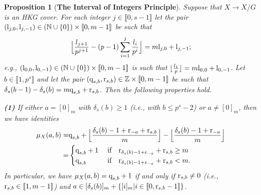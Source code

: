 \documentclass[11pt]{amsart}
\newtheorem{proposition}[theorem]{Proposition}
\def\l{\textup{l}}
\def\r{\textup{r}}
\def\q{\textup{q}}
\begin{document}
\begin{proposition}[{\bf The Interval of Integers Principle}]
\label{P8}
Suppose that $X\rightarrow X/G$ is an HKG cover. For each integer $j\in\llbracket0,s-1\rrbracket$ let the pair $(\l_{j,0},\l_{j,-1})\in (\mathbb N\cup\{0\})\times\llbracket0,m-1\rrbracket$ be such that 
$$\Big\lfloor\frac{l_{j+1}}{p^{j+1}}-(p-1)\sum_{i=1}^j\frac{l_i}{p^i}\Big\rfloor=m\l_{j,0}+\l_{j,-1};$$
e.g., $(\l_{0,0},\l_{0,-1})\in (\mathbb N\cup\{0\})\times\llbracket0,m-1\rrbracket$ is such that $\lfloor\frac{l_1}{p}\rfloor=m\l_{0,0}+\l_{0,-1}$. Let $b\in\llbracket1,p^s\rrbracket$ and let the pair $(\q_{s,b},\r_{s,b})\in \mathbb Z\times\llbracket0,m-1\rrbracket$ be such that $\delta_s(b-1)-\delta_s(b)=m\q_{s,b}+\r_{s,b}$.  Then the following properties hold.

\medskip
{\bf (1)} If either $a=[0]_m$ with $\delta_s(b)\ge 1$ (i.e., with $b\le p^s-2$) or $a\neq [0]_m$, then we have identities
\begin{equation}\label{EQ58}
\begin{split}\mu_X(a,b)=&\q_{s,b}+\Big\lfloor\frac{\delta_s(b)-1+\r_{-a}+\r_{s,b}}{m}\Big\rfloor-\Big\lfloor\frac{\delta_s(b)-1+\r_{-a}}{m}\Big\rfloor\\
=&\begin{cases}\q_{s,b}+1\quad\;\textup{if}\quad \r_{\delta_s(b)-1+\r_{-a}}+\r_{s,b}\ge m\\
\q_{s,b}\quad\quad\quad\textup{if}\quad \r_{\delta_s(b)-1+\r_{-a}}+\r_{s,b}<m.\end{cases}
\end{split}
\end{equation}
In particular, we have $\mu_X(a,b)=\q_{s,b}+1$ if and only if $\r_{s,b}\neq 0$ (i.e., $\r_{s,b}\in\llbracket1,m-1\rrbracket$) and $a\in [\delta_s(b)]_m+\{[i]_m|i\in\llbracket0,\r_{s,b}-1\rrbracket\}$.


\end{proposition}
\end{document}
